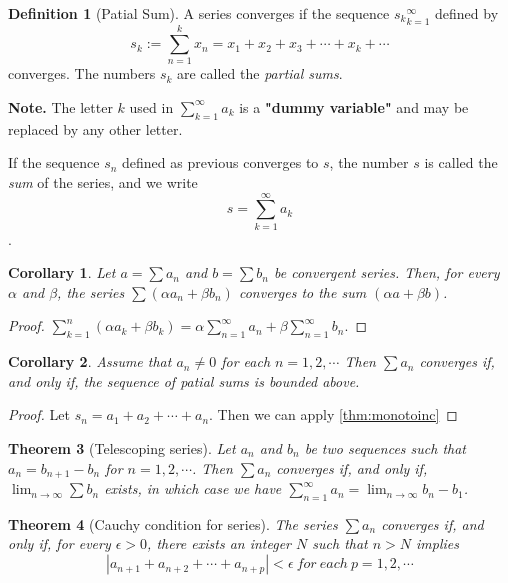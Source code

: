 \documentclass{article}
\newtheorem{theorem}{Theorem}[section]
\newtheorem{corollary}[theorem]{Corollary}
\theoremstyle{definition}
\newtheorem{defi}{Definition}[section]
\begin{document}
\begin{defi}[Patial Sum]
A series converges if the sequence ${s_{k}}_{k=1}^{\infty}$ defined by 
$$s_{k}:=\sum_{n=1}^{k}x_{n}=x_{1}+x_{2}+x_{3}+\cdots +x_{k}+\cdots$$
converges. The numbers $s_{k}$ are called the \textit{partial sums}.
\end{defi}

\textbf{Note.} The letter $k$ used in $\sum_{k=1}^{\infty}a_{k}$ 
is a \textbf{"dummy variable"} and may be replaced by 
any other letter.

If the sequence ${s_{n}}$ defined as previous converges to $s$, the 
number $s$ is called the \textit{sum} of the series, and we write
$$ s=\sum_{k=1}^{\infty}a_{k}$$.

\begin{corollary}
    Let $a=\sum a_{n}$ and $b=\sum b_{n}$ be convergent 
    series. Then, for every $\alpha$ and $\beta$, the series $\sum (\alpha a_{n}+\beta b_{n})$
    converges to the sum $(\alpha a+\beta b)$.
\end{corollary}
\begin{proof}
    $\sum_{k=1}^{n} (\alpha a_{k}+\beta b_{k})=\alpha \sum_{n=1}^{\infty}a_{n}+\beta \sum_{n=1}^{\infty}b_{n}.$
\end{proof}

\begin{corollary}
    Assume that $a_{n}\neq 0$ for each $n=1,2,\cdots$ Then $\sum a_{n}$
    converges if, and only if, the sequence of patial sums is bounded above.
\end{corollary}
\begin{proof}
    Let $s_{n}=a_{1}+a_{2}+\cdots+a_{n}$. Then we can apply \ref{thm:monotoinc}
\end{proof}

\begin{theorem}[Telescoping series]
    Let ${a_{n}}$ and ${b_{n}}$ be two sequences 
    such that $a_{n}=b_{n+1}-b_{n}$ for $n=1,2,\cdots$.
    Then $\sum a_{n}$ converges if, and only if, 
    $\lim_{n\rightarrow \infty}\sum b_{n}$ exists, in which 
    case we have $\sum_{n=1}^{\infty} a_{n}=\lim_{n\rightarrow \infty}b_{n}-b_{1}$.
\end{theorem}

\begin{theorem}[Cauchy condition for series]
    The series $\sum a_{n}$ converges if, and only if,
    for every $\epsilon>0$, there exists an integer $N$ such that
    $n>N$ implies 
    $$|a_{n+1}+a_{n+2}+\cdots+a_{n+p}|<\epsilon\ for\ each\ p=1,2,\cdots$$
\end{theorem}
\end{document}
